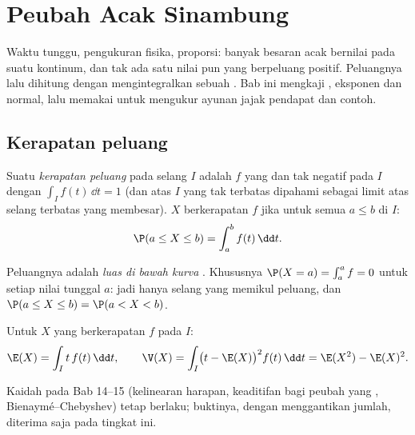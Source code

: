 \chapter{Peubah Acak Sinambung}\label{ch:g12:contdist}

Waktu tunggu, pengukuran fisika, proporsi: banyak besaran acak
bernilai pada suatu kontinum, dan tak ada satu nilai pun yang berpeluang positif.
Peluangnya lalu dihitung dengan mengintegralkan sebuah \emph{}. Bab
ini mengkaji , eksponen dan normal, lalu memakai
 untuk mengukur ayunan jajak pendapat dan contoh.

\section{Kerapatan peluang}

\begin{definition}\label{def:g12:contdist:density}
Suatu \emph{kerapatan peluang} pada selang $I$ adalah 
$f$ yang  dan tak negatif pada $I$ dengan $\int_I f(t)\,\dd t = 1$
(dan  atas $I$ yang tak terbatas dipahami sebagai limit
 atas selang terbatas yang membesar).  $X$ berkerapatan
$f$ jika untuk semua $a \leq b$ di $I$:
\[
\P(a \leq X \leq b) = \int_a^b f(t)\,\dd t .
\]
\end{definition}

Peluangnya adalah \emph{luas di bawah kurva }. Khususnya
$\P(X = a) = \int_a^a f = 0$ untuk setiap nilai tunggal $a$: jadi hanya selang
yang memikul peluang, dan $\P(a \leq X \leq b) = \P(a < X < b)$.

\begin{definition}\label{def:g12:contdist:exp}
Untuk $X$ yang berkerapatan $f$ pada $I$:
\[
\E(X) = \int_I t\,f(t)\,\dd t, \qquad
\V(X) = \int_I \bigl(t - \E(X)\bigr)^2 f(t)\,\dd t
= \E(X^2) - \E(X)^2 .
\]
\end{definition}

Kaidah pada Bab 14--15 (kelinearan harapan, keaditifan
 bagi peubah yang , Bienaymé--Chebyshev) tetap berlaku;
buktinya, dengan  menggantikan jumlah, diterima saja pada tingkat ini.

